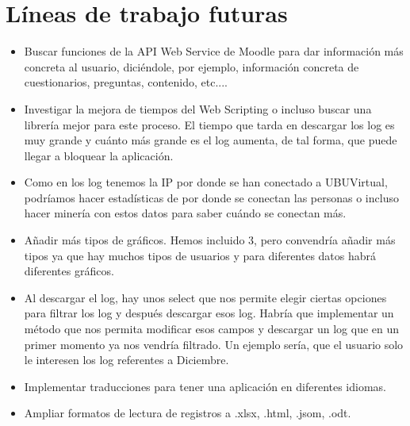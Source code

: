 \section{Líneas de trabajo futuras}\label{luxedneas-de-trabajo-futuras}

\begin{itemize}
	\tightlist
	\item
	Buscar funciones de la API Web Service de Moodle para dar información más concreta al usuario, diciéndole, por ejemplo, información concreta de cuestionarios, preguntas, contenido, etc....
	\item
	Investigar la mejora de tiempos del Web Scripting o incluso buscar una librería mejor para este proceso. El tiempo que tarda en descargar los log es muy grande y cuánto más grande es el log aumenta, de tal forma, que puede llegar a bloquear la aplicación.
	\item
	Como en los log tenemos la IP por donde se han conectado a UBUVirtual, podríamos hacer estadísticas de por donde se conectan las personas o incluso hacer minería con estos datos para saber cuándo se conectan más.
	\item
	Añadir más tipos de gráficos. Hemos incluido 3, pero convendría añadir más tipos ya que hay muchos tipos de usuarios y para diferentes datos habrá diferentes gráficos.
	\item
	Al descargar el log, hay unos select que nos permite elegir ciertas opciones para filtrar los log y después descargar esos log. Habría que implementar un método que nos permita modificar esos campos y descargar un log que en un primer momento ya nos vendría filtrado. Un ejemplo sería, que el usuario solo le interesen los log referentes a Diciembre.
	\item
	Implementar traducciones para tener una aplicación en diferentes idiomas.
	\item
	Ampliar formatos de lectura de registros a .xlsx, .html, .jsom, .odt.
	
\end{itemize}
